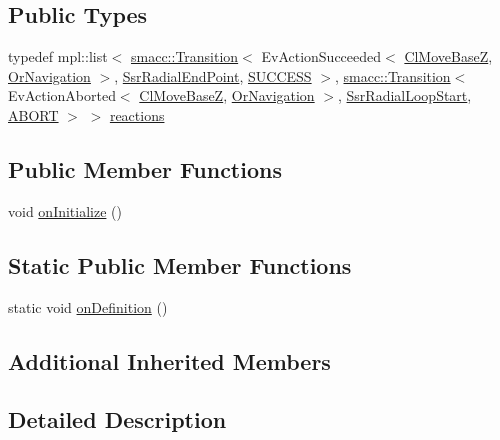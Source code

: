 \subsection*{Public Types}
\begin{DoxyCompactItemize}
\item 
typedef mpl\+::list$<$ \hyperlink{classsmacc_1_1Transition}{smacc\+::\+Transition}$<$ Ev\+Action\+Succeeded$<$ \hyperlink{classmove__base__z__client_1_1ClMoveBaseZ}{Cl\+Move\+BaseZ}, \hyperlink{classsm__dance__bot_1_1OrNavigation}{Or\+Navigation} $>$, \hyperlink{structsm__dance__bot_1_1radial__motion__states_1_1SsrRadialEndPoint}{Ssr\+Radial\+End\+Point}, \hyperlink{classSUCCESS}{S\+U\+C\+C\+E\+SS} $>$, \hyperlink{classsmacc_1_1Transition}{smacc\+::\+Transition}$<$ Ev\+Action\+Aborted$<$ \hyperlink{classmove__base__z__client_1_1ClMoveBaseZ}{Cl\+Move\+BaseZ}, \hyperlink{classsm__dance__bot_1_1OrNavigation}{Or\+Navigation} $>$, \hyperlink{structsm__dance__bot_1_1radial__motion__states_1_1SsrRadialLoopStart}{Ssr\+Radial\+Loop\+Start}, \hyperlink{classABORT}{A\+B\+O\+RT} $>$ $>$ \hyperlink{structsm__dance__bot_1_1radial__motion__states_1_1SsrRadialRotate_a945e2db27b211b38e6b3959cc7f64dbd}{reactions}
\end{DoxyCompactItemize}
\subsection*{Public Member Functions}
\begin{DoxyCompactItemize}
\item 
void \hyperlink{structsm__dance__bot_1_1radial__motion__states_1_1SsrRadialRotate_ad04ad0c26c9d2bff70ff19b4dee71252}{on\+Initialize} ()
\end{DoxyCompactItemize}
\subsection*{Static Public Member Functions}
\begin{DoxyCompactItemize}
\item 
static void \hyperlink{structsm__dance__bot_1_1radial__motion__states_1_1SsrRadialRotate_afe95818cf995cfa8442caa15daf9a867}{on\+Definition} ()
\end{DoxyCompactItemize}
\subsection*{Additional Inherited Members}


\subsection{Detailed Description}


